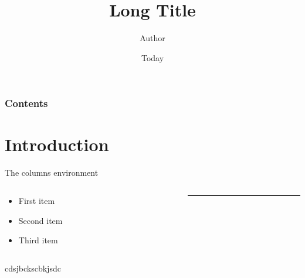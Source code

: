 \documentclass{beamer}
\begin{document}
    \title[Short Title]{Long Title}
    \author[Lastname]{Author}


    \date{Today}


		\begin{frame}
    \titlepage
    \end{frame}


    \begin{frame}
    \frametitle{Contents}
    \tableofcontents
    \end{frame}


    \section{Introduction}

\begin{frame}{The columns environment}
\begin{columns}
    \begin{column}{0.47\textwidth}
        \begin{itemize}
            \item First item
            \item Second item
            \item Third item
        \end{itemize}
    \end{column}
    \begin{column}{0.5\textwidth}
        \rule{\textwidth}{0.75\textwidth}
    \end{column}
\end{columns}

\begin{block}
cdsjbckscbkjsdc
\end{block}

\end{frame}


    
\end{document}

